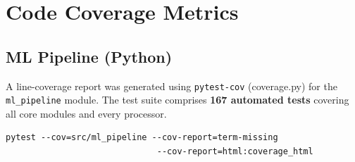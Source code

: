 \documentclass[12pt, titlepage]{article}
\begin{document}
\setlength{\tabcolsep}{6pt}
\renewcommand{\arraystretch}{1.2}
\normalsize
\FloatBarrier

\section{Code Coverage Metrics}

\subsection{ML Pipeline (Python)}

A line-coverage report was generated using \texttt{pytest-cov} (coverage.py) for the
\texttt{ml\_pipeline} module. The test suite comprises \textbf{167 automated tests}
covering all core modules and every processor.

\begin{verbatim}
pytest --cov=src/ml_pipeline --cov-report=term-missing
                              --cov-report=html:coverage_html
\end{verbatim}
\end{document}
